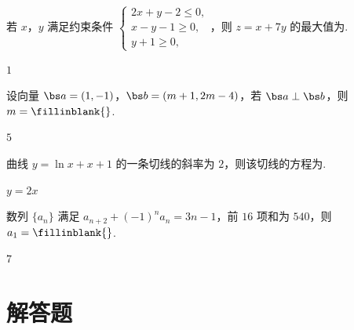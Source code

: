 \begin{problem}
若 \(x\)，\(y\) 满足约束条件 \(\begin{cases}
2x+y-2\le 0,\\
x-y-1\ge 0,\\
y+1\ge 0,
\end{cases}\)，则 \(z=x+7y\) 的最大值为\fillinblank{}.
\end{problem}

\begin{answer}
\(1\)
\end{answer}

\begin{problem}
设向量 \(\bs a=(1,-1)\)，\(\bs b=(m+1,2m-4)\)，若 \(\bs a\perp\bs b\)，则 \(m=\fillinblank{}\).
\end{problem}

\begin{answer}
\(5\)
\end{answer}

\begin{problem}
曲线 \(y=\ln x+x+1\) 的一条切线的斜率为 \(2\)，则该切线的方程为\fillinblank{}.
\end{problem}

\begin{answer}
\(y=2x\)
\end{answer}

\begin{problem}
数列 \(\{a_n\}\) 满足 \(a_{n+2}+(-1)^n a_n=3n-1\)，前 \(16\) 项和为 \(540\)，则 \(a_1=\fillinblank{}\).
\end{problem}

\begin{answer}
\(7\)
\end{answer}

\section{解答题}

